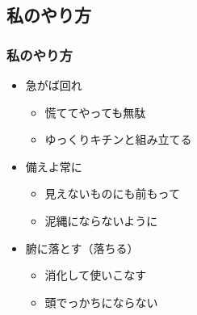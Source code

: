 \documentclass[12pt, dvipdfmx]{beamer}
\begin{document}
\subsection{私のやり方}
\begin{frame}
    \frametitle{私のやり方}
        \begin{itemize}
            \LARGE
            \item 急がば回れ
            \begin{itemize}
                \Large
                \item<2-> 慌ててやっても無駄
                \item<2-> ゆっくりキチンと組み立てる
            \end{itemize}
            \item 備えよ常に
            \begin{itemize}
                \Large
                \item<3-> 見えないものにも前もって
                \item<3-> 泥縄にならないように
            \end{itemize}
            \item 腑に落とす（落ちる）
            \begin{itemize}
                \Large
                \item<4> 消化して使いこなす
                \item<4> 頭でっかちにならない
            \end{itemize}
        \end{itemize}
\end{frame}

            
\end{document}
